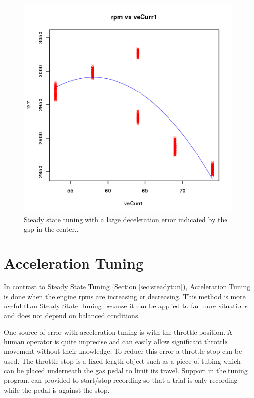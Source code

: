\documentclass{article}
\begin{document}
\begin{figure}[tbp]
\center
\includegraphics[scale=0.5]{plotdata-veTable1-20110613-15:17:10.png}
\caption{Steady state tuning with a large deceleration error
indicated by the gap in the center..}
\label{fig:ssrerr}
\end{figure}

\section{Acceleration Tuning}
\label{sec:acctun}

In contrast to Steady State Tuning (Section \ref{sec:steadytun}), Acceleration
Tuning is done when the engine rpms are increasing or decreasing.
This method is more useful than Steady State Tuning because it can be
applied to far more situations and does not depend on balanced conditions.

One source of error with acceleration tuning is with the throttle position.
A human operator is quite imprecise and can easily allow significant
throttle movement without their knowledge.
To reduce this error a throttle stop can be used.
The throttle stop is a fixed length object such as a piece of tubing which
can be placed underneath the gas pedal to limit its travel.
Support in the tuning program can provided to start/stop recording so
that a trial is only recording while the pedal is against the stop.
\end{document}
